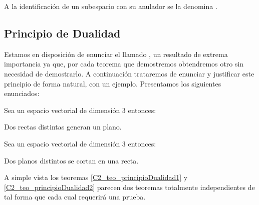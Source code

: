 A la identificación de un subespacio con su anulador se la denomina .
\subsection{Principio de Dualidad}
\label{C2_principioDualidadLineal}

Estamos en disposición de enunciar el llamado , un resultado de extrema importancia ya que, por cada teorema que demostremos obtendremos otro sin necesidad de demostrarlo. A continuación trataremos de enunciar y justificar este principio de forma natural, con un ejemplo. Presentamos los siguientes enunciados:
\begin{theo}
	\label{C2_teo_principioDualidad1}
	Sea un espacio vectorial de dimensión $3$ entonces:
	
	Dos rectas distintas generan un plano.
\end{theo}
\begin{theo}
	\label{C2_teo_principioDualidad2}
	Sea un espacio vectorial de dimensión $3$ entonces:
	
	Dos planos distintos se cortan en una recta.
\end{theo}
A simple vista los teoremas \ref{C2_teo_principioDualidad1} y \ref{C2_teo_principioDualidad2} parecen dos teoremas totalmente independientes de tal forma que cada cual requerirá una prueba.

